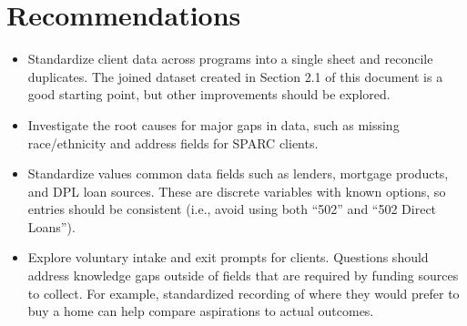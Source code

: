 \documentclass[
  letterpaper,
  DIV=11,
  numbers=noendperiod]{scrartcl}
\providecommand{\tightlist}{%
  \setlength{\itemsep}{0pt}\setlength{\parskip}{0pt}}\usepackage{longtable,booktabs,array}
\begin{document}
\hypertarget{recommendations}{%
\section{Recommendations}\label{recommendations}}

\begin{itemize}
\tightlist
\item
  Standardize client data across programs into a single sheet and
  reconcile duplicates. The joined dataset created in Section 2.1 of
  this document is a good starting point, but other improvements should
  be explored.
\item
  Investigate the root causes for major gaps in data, such as missing
  race/ethnicity and address fields for SPARC clients.
\item
  Standardize values common data fields such as lenders, mortgage
  products, and DPL loan sources. These are discrete variables with
  known options, so entries should be consistent (i.e., avoid using both
  ``502'' and ``502 Direct Loans'').
\item
  Explore voluntary intake and exit prompts for clients. Questions
  should address knowledge gaps outside of fields that are required by
  funding sources to collect. For example, standardized recording of
  where they would prefer to buy a home can help compare aspirations to
  actual outcomes.
\end{itemize}
\end{document}
